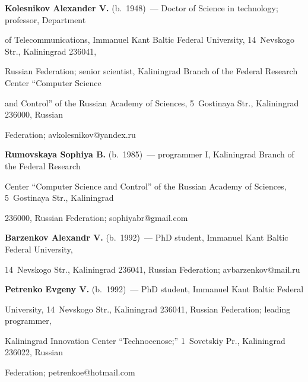 \vspace*{3pt}





\noindent


\textbf{Kolesnikov Alexander V.} (b.\ 1948)~--- Doctor of Science in technology; professor, Department 


of Telecommunications, Immanuel Kant Baltic Federal University, 14~Nevskogo Str., Kaliningrad 236041, 


Russian Federation; senior scientist, Kaliningrad Branch of the Federal Research Center ``Computer Science 


and Control'' of the Russian Academy of Sciences, 5~Gostinaya Str.,  Kaliningrad 236000, Russian 


Federation; \mbox{avkolesnikov@yandex.ru}





\vspace*{3pt}





\noindent


\textbf{Rumovskaya Sophiya B.} (b.\ 1985)~--- programmer I, Kaliningrad Branch of the Federal Research 


Center ``Computer Science and Control'' of the Russian Academy of Sciences, 5~Gostinaya Str., Kaliningrad 


236000, Russian Federation; \mbox{sophiyabr@gmail.com}





\vspace*{3pt}





\noindent


\textbf{Barzenkov Alexandr V.} (b.\ 1992)~--- PhD student, Immanuel Kant Baltic Federal University, 


14~Nevskogo Str., Kaliningrad 236041, Russian Federation; \mbox{avbarzenkov@mail.ru}





\vspace*{3pt}





\noindent


\textbf{Petrenko Evgeny V.} (b.\ 1992)~--- PhD student, Immanuel Kant Baltic Federal 


University, 14~Nevskogo Str., Kaliningrad 236041, Russian Federation; leading programmer, 


Kaliningrad Innovation Center ``Technocenose;'' 1~Sovetskiy Pr., Kaliningrad 236022, Russian 


Federation; \mbox{petrenkoe@hotmail.com}





\label{end\stat}








\renewcommand{\bibname}{\protect\rm Литература}


